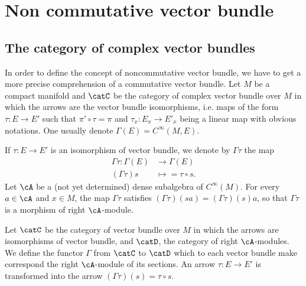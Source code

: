 


\section{Non commutative vector bundle}


\subsection{The category of complex vector bundles}

In order to define the concept of noncommutative vector bundle, we have to get a more precise comprehension of a commutative vector bundle. Let $M$ be a compact manifold and $\catC$ be the category of complex vector bundle over $M$ in which the arrows are the vector bundle isomorphisms, i.e. maps of the form $\tau\colon E\to E'$ such that $\pi'\circ\tau=\pi$ and $\tau_x\colon E_x\to E'_x$ being a linear map with obvious notations. One usually denote $\Gamma(E)= C^{\infty}(M,E)$.

If $\tau\colon E\to E'$ is an isomorphism of vector bundle, we denote by $\Gamma\tau$ the map
\begin{equation}
	\begin{aligned}
		\Gamma\tau\colon \Gamma(E) & \to \Gamma(E)         \\
		(\Gamma\tau)s              & \mapsto =\tau\circ s.
	\end{aligned}
\end{equation}
Let $\cA$ be a (not yet determined) dense subalgebra of $ C^{\infty}(M)$.
For every $a\in\cA$ and $x\in M$, the map $\Gamma\tau$ satisfies $(\Gamma\tau)(sa)=(\Gamma\tau)(s)a$, so that $\Gamma\tau$ is a morphism of right $\cA$-module.

Let $\catC$ be the category of vector bundle over $M$ in which the arrows are isomorphisms of vector bundle, and $\catD$, the category of right $\cA$-modules. We define the functor $\Gamma$ from $\catC$ to $\catD$ which to each vector bundle make correspond the right $\cA$-module of its sections. An arrow $\tau\colon E\to E'$ is transformed into the arrow $(\Gamma\tau)(s)=\tau\circ s$.

